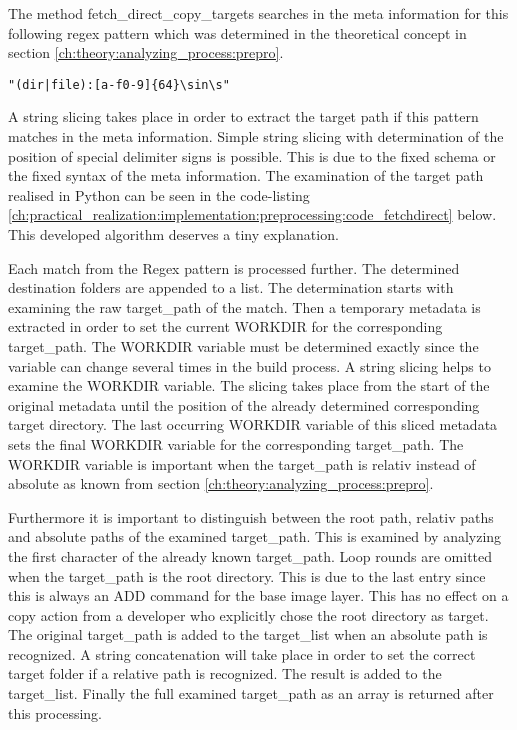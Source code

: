 The method fetch\_direct\_copy\_targets searches in the meta information for this following regex pattern which was determined in the theoretical concept in section \ref{ch:theory:analyzing_process:prepro}.
\begin{lstlisting}
"(dir|file):[a-f0-9]{64}\sin\s"
\end{lstlisting}
A string slicing takes place in order to extract the target path if this pattern matches in the meta information. 
Simple string slicing with determination of the position of special delimiter signs is possible. 
This is due to the fixed schema or the fixed syntax of the meta information.
The examination of the target path realised in Python can be seen in the code-listing \ref{ch:practical_realization:implementation:preprocessing:code_fetchdirect} below.
This developed algorithm deserves a tiny explanation.

Each match from the Regex pattern is processed further. 
The determined destination folders are appended to a list. 
The determination starts with examining the raw target\_path of the match. 
Then a temporary metadata is extracted in order to set the current WORKDIR for the corresponding target\_path. 
The WORKDIR variable must be determined exactly since the variable can change several times in the build process. 
A string slicing helps to examine the WORKDIR variable. 
The slicing takes place from the start of the original metadata until the position of the already determined corresponding target directory. 
The last occurring WORKDIR variable of this sliced metadata sets the final WORKDIR variable for the corresponding target\_path. 
The WORKDIR variable is important when the target\_path is relativ instead of absolute as known from section \ref{ch:theory:analyzing_process:prepro}.

Furthermore it is important to distinguish between the root path, relativ paths and absolute paths of the examined target\_path. 
This is examined by analyzing the first character of the already known target\_path. 
Loop rounds are omitted when the target\_path is the root directory. 
This is due to the last entry since this is always an ADD command for the base image layer. 
This has no effect on a copy action from a developer who explicitly chose the root directory as target.
The original target\_path is added to the target\_list when an absolute path is recognized. 
A string concatenation will take place in order to set the correct target folder if a relative path is recognized. The result is added to the target\_list.
Finally the full examined target\_path as an array is returned after this processing.

